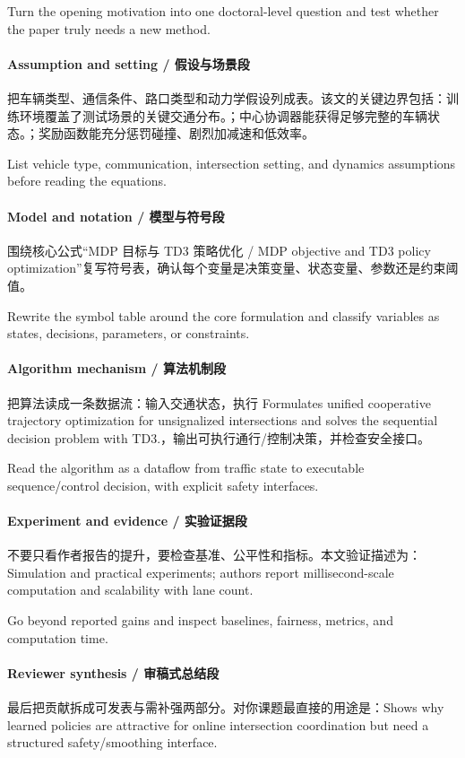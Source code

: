 \documentclass[UTF8,a4paper,11pt,fontset=fandol]{ctexart}
\begin{document}
Turn the opening motivation into one doctoral-level question and test whether the paper truly needs a new method.

\paragraph{Assumption and setting / 假设与场景段}把车辆类型、通信条件、路口类型和动力学假设列成表。该文的关键边界包括：训练环境覆盖了测试场景的关键交通分布。；中心协调器能获得足够完整的车辆状态。；奖励函数能充分惩罚碰撞、剧烈加减速和低效率。

List vehicle type, communication, intersection setting, and dynamics assumptions before reading the equations.

\paragraph{Model and notation / 模型与符号段}围绕核心公式“MDP 目标与 TD3 策略优化 / MDP objective and TD3 policy optimization”复写符号表，确认每个变量是决策变量、状态变量、参数还是约束阈值。

Rewrite the symbol table around the core formulation and classify variables as states, decisions, parameters, or constraints.

\paragraph{Algorithm mechanism / 算法机制段}把算法读成一条数据流：输入交通状态，执行 Formulates unified cooperative trajectory optimization for unsignalized intersections and solves the sequential decision problem with TD3.，输出可执行通行/控制决策，并检查安全接口。

Read the algorithm as a dataflow from traffic state to executable sequence/control decision, with explicit safety interfaces.

\paragraph{Experiment and evidence / 实验证据段}不要只看作者报告的提升，要检查基准、公平性和指标。本文验证描述为：Simulation and practical experiments; authors report millisecond-scale computation and scalability with lane count.

Go beyond reported gains and inspect baselines, fairness, metrics, and computation time.

\paragraph{Reviewer synthesis / 审稿式总结段}最后把贡献拆成可发表与需补强两部分。对你课题最直接的用途是：Shows why learned policies are attractive for online intersection coordination but need a structured safety/smoothing interface.
\end{document}
